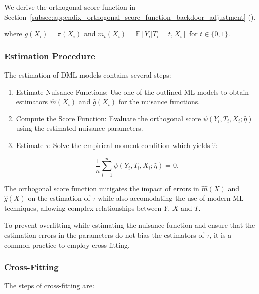 \documentclass{article}
\numberwithin{equation}{section}
\begin{document}
We derive the orthogonal score function in Section~\ref{subsec:appendix_orthogonal_score_function_backdoor_adjustment} (\cite{ChernozhukovChetverikovDemireretal2018}).

where $g(X_i) = \pi(X_i)$ and $m_t(X_i) = \mathbb{E}[Y_i | T_i = t, X_i]$ for $t \in \{0,1\}$.

\subsubsection{Estimation Procedure}

The estimation of DML models contains several steps:
\begin{enumerate}[label=\roman*.]
\item Estimate Nuisance Functions: Use one of the outlined ML models to obtain estimators $\hat{m}(X_i)$ and $\hat{g}(X_i)$ for the nuisance functions.

\item Compute the Score Function: Evaluate the orthogonal score $\psi(Y_i, T_i, X_i; \hat{\eta})$ using the estimated nuisance parameters.

\item Estimate $\tau$: Solve the empirical moment condition which yields $\hat{\tau}$:

\begin{equation}
\frac{1}{n} \sum_{i=1}^n \psi(Y_i, T_i, X_i; \hat{\eta}) = 0.
\label{eq:orthogonal_score_psi}
\end{equation}
\end{enumerate}

The orthogonal score function mitigates the impact of errors in $\hat{m}(X)$ and $\hat{g}(X)$ on the estimation of $\tau$ while also accomodating the use of modern ML techniques, allowing complex relationships between $Y$, $X$ and $T$.

To prevent overfitting while estimating the nuisance function and ensure that the estimation errors in the parameters do not bias the estimators of $\tau$, it is a common practice to employ cross-fitting.

\subsubsection{Cross-Fitting}

The steps of cross-fitting are:
\end{document}
